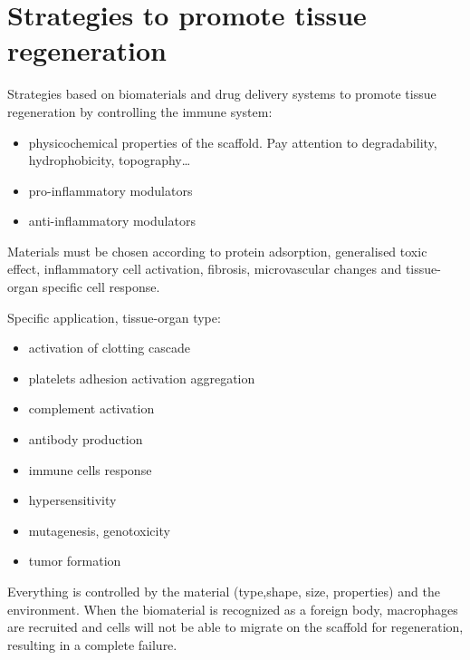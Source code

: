 \section{Strategies to promote tissue regeneration}
Strategies based on biomaterials and drug delivery systems to promote tissue regeneration by controlling the immune system:
\begin{itemize}
\item physicochemical properties of the scaffold. Pay attention to degradability, hydrophobicity, topography…
\item pro-inflammatory modulators
\item anti-inflammatory modulators
\end{itemize}
\noindent
Materials must be chosen according to	protein adsorption, generalised toxic effect, inflammatory cell activation, fibrosis, microvascular changes and tissue-organ specific cell response.

Specific application, tissue-organ type:
\begin{itemize}
\item activation of clotting cascade
\item platelets adhesion activation aggregation
\item complement activation
\item antibody production
\item immune cells response
\item hypersensitivity
\item mutagenesis, genotoxicity
\item tumor formation
\end{itemize}
\noindent
Everything is controlled by the material (type,shape, size, properties) and the environment.
When the biomaterial is recognized as a foreign body, macrophages are recruited and cells will not be able to migrate on the scaffold for regeneration, resulting in a complete failure.

